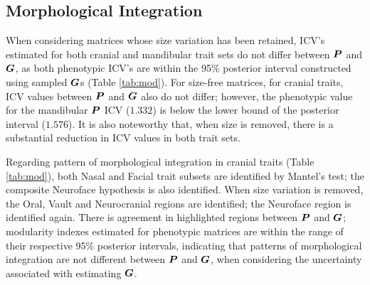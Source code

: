 \documentclass [twocolumn, natbib, nospthms, 10pt] {svjour3}
\begin{document}
\subsection {Morphological Integration}

When considering matrices whose size variation has been retained,
ICV's estimated for both cranial and mandibular trait sets do not
differ between $\boldsymbol{P}$ and $\boldsymbol{G}$, as both phenotypic ICV's are
within the 95\% posterior interval constructed using sampled
$\boldsymbol{G}$s (Table \ref{tab:mod}). For size-free matrices, for cranial
traits, ICV values between $\boldsymbol{P}$ and $\boldsymbol{G}$ also do not differ;
however, the phenotypic value for the mandibular $\boldsymbol{P}$ ICV
($1.332$) is below the lower bound of the posterior interval
($1.576$). It is also noteworthy that, when size is removed, there is
a substantial reduction in ICV values in both trait sets.

Regarding pattern of morphological integration in cranial traits
(Table \ref{tab:mod}), both Nasal and Facial trait subsets are
identified by Mantel's test; the composite Neuroface hypothesis is
also identified. When size variation is removed, the Oral, Vault and
Neurocranial regions are identified; the Neuroface region is
identified again. There is agreement in highlighted regions between
$\boldsymbol{P}$ and $\boldsymbol{G}$; modularity indexes estimated for phenotypic
matrices are within the range of their respective 95\% posterior
intervals, indicating that patterns of morphological integration are
not different between $\boldsymbol{P}$ and $\boldsymbol{G}$, when considering the
uncertainty associated with estimating $\boldsymbol{G}$.
\end{document}
